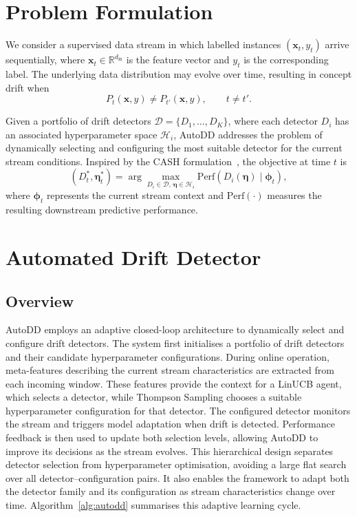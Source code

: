 \documentclass[conference]{IEEEtran}
\begin{document}
\section{Problem Formulation}
\label{sec:problem}

We consider a supervised data stream in which labelled instances $(\mathbf{x}_t,y_t)$ arrive sequentially, where $\mathbf{x}_t \in \mathbb{R}^{d_{\mathrm{in}}}$ is the feature vector and $y_t$ is the corresponding label. The underlying data distribution may evolve over time, resulting in concept drift when
\begin{equation}
P_t(\mathbf{x},y) \neq P_{t'}(\mathbf{x},y), \qquad t \neq t'.
\end{equation}

Given a portfolio of drift detectors $\mathcal{D}=\{D_1,\ldots,D_K\}$, where each detector $D_i$ has an associated hyperparameter space $\mathcal{H}_i$, AutoDD addresses the problem of dynamically selecting and configuring the most suitable detector for the current stream conditions. Inspired by the CASH formulation~\cite{Hutter2019AutoML}, the objective at time $t$ is
\begin{equation}
\label{eq:cash}
(D_t^*,\boldsymbol{\eta}_t^*)
=
\arg\max_{D_i\in\mathcal{D},\,\boldsymbol{\eta}\in\mathcal{H}_i}
\mathrm{Perf}\!\left(D_i(\boldsymbol{\eta}) \mid \boldsymbol{\phi}_t\right),
\end{equation}
where $\boldsymbol{\phi}_t$ represents the current stream context and $\mathrm{Perf}(\cdot)$ measures the resulting downstream predictive performance.

\section{Automated Drift Detector}
\label{sec:method}

\subsection{Overview}

AutoDD employs an adaptive closed-loop architecture to dynamically select and configure drift detectors. The system first initialises a portfolio of drift detectors and their candidate hyperparameter configurations. During online operation, meta-features describing the current stream characteristics are extracted from each incoming window. These features provide the context for a LinUCB agent, which selects a detector, while Thompson Sampling chooses a suitable hyperparameter configuration for that detector. The configured detector monitors the stream and triggers model adaptation when drift is detected. Performance feedback is then used to update both selection levels, allowing AutoDD to improve its decisions as the stream evolves. This hierarchical design separates detector selection from hyperparameter optimisation, avoiding a large flat search over all detector--configuration pairs. It also enables the framework to adapt both the detector family and its configuration as stream characteristics change over time. Algorithm~\ref{alg:autodd} summarises this adaptive learning cycle.
\end{document}
